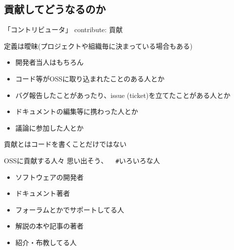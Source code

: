 \documentclass[
        unicode%
    ]{beamer}
\newcommand*\hashtag[1]{{\texttt{\#}{#1}}}
\begin{document}
\subsection{貢献してどうなるのか}

\begin{frame}{「コントリビュータ」}
    contribute: 貢献

    定義は曖昧(プロジェクトや組織毎に決まっている場合もある)

    \begin{itemize}
        \item 開発者当人はもちろん
        \pause
        \item コード等がOSSに取り込まれたことのある人とか
        \pause
        \item バグ報告したことがあったり、issue (ticket)を立てたことがある人とか
        \pause
        \item ドキュメントの編集等に携わった人とか
        \pause
        \item 議論に参加した人とか
    \end{itemize}

    \pause
    \alert{貢献とはコードを書くことだけではない}
\end{frame}

\begin{frame}{OSSに貢献する人々}
    思い出そう、 ~ \hashtag{いろいろな人}

    \begin{itemize}
        \item ソフトウェアの開発者
        \item ドキュメント著者
        \item フォーラムとかでサポートしてる人
        \item 解説の本や記事の著者
        \item 紹介・布教してる人
    \end{itemize}
\end{frame}
\end{document}
